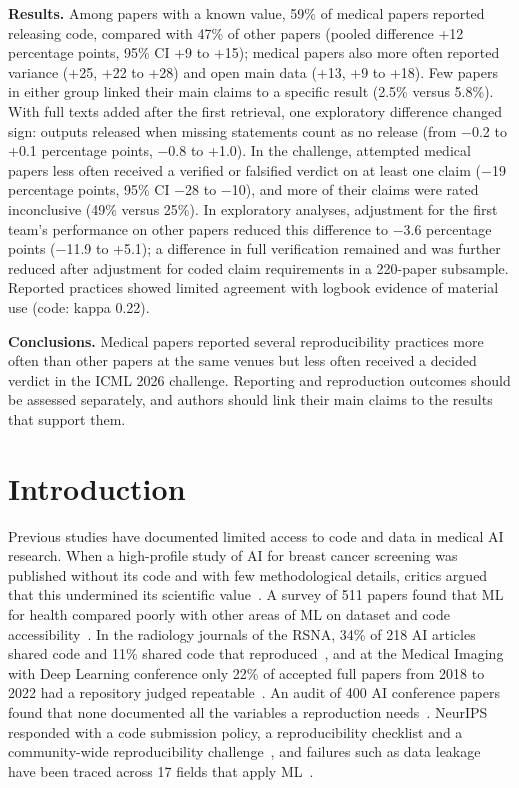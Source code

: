 \documentclass[11pt]{article}
\begin{document}
\textbf{Results.} Among papers with a known value, 59\% of medical papers reported releasing code, compared with 47\% of other papers (pooled difference +12 percentage points, 95\% CI +9 to +15); medical papers also more often reported variance (+25, +22 to +28) and open main data (+13, +9 to +18). Few papers in either group linked their main claims to a specific result (2.5\% versus 5.8\%). With full texts added after the first retrieval, one exploratory difference changed sign: outputs released when missing statements count as no release (from −0.2 to +0.1 percentage points, −0.8 to +1.0). In the challenge, attempted medical papers less often received a verified or falsified verdict on at least one claim (−19 percentage points, 95\% CI −28 to −10), and more of their claims were rated inconclusive (49\% versus 25\%). In exploratory analyses, adjustment for the first team's performance on other papers reduced this difference to −3.6 percentage points (−11.9 to +5.1); a difference in full verification remained and was further reduced after adjustment for coded claim requirements in a 220-paper subsample. Reported practices showed limited agreement with logbook evidence of material use (code: kappa 0.22).

\textbf{Conclusions.} Medical papers reported several reproducibility practices more often than other papers at the same venues but less often received a decided verdict in the ICML 2026 challenge. Reporting and reproduction outcomes should be assessed separately, and authors should link their main claims to the results that support them.

\section*{Introduction}
Previous studies have documented limited access to code and data in medical AI research. When a high-profile study of AI for breast cancer screening was published without its code and with few methodological details, critics argued that this undermined its scientific value~\cite{r1}. A survey of 511 papers found that ML for health compared poorly with other areas of ML on dataset and code accessibility~\cite{r2}. In the radiology journals of the RSNA, 34\% of 218 AI articles shared code and 11\% shared code that reproduced~\cite{r3}, and at the Medical Imaging with Deep Learning conference only 22\% of accepted full papers from 2018 to 2022 had a repository judged repeatable~\cite{r4}. An audit of 400 AI conference papers found that none documented all the variables a reproduction needs~\cite{r5}. NeurIPS responded with a code submission policy, a reproducibility checklist and a community-wide reproducibility challenge~\cite{r6}, and failures such as data leakage have been traced across 17 fields that apply ML~\cite{r7}.
\end{document}

